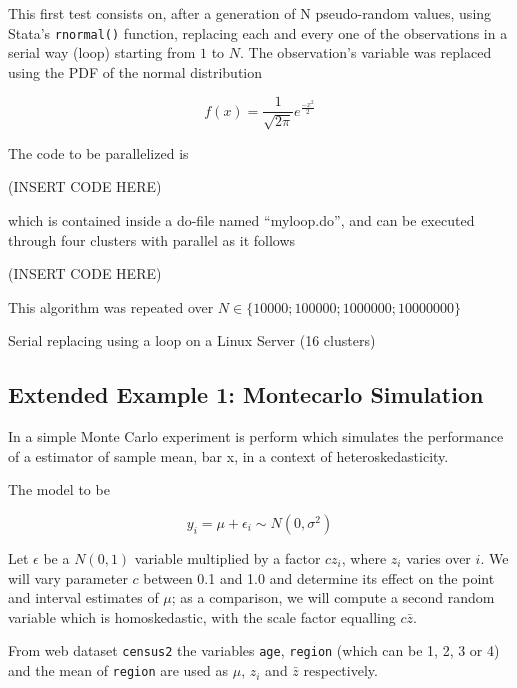 \documentclass[bib]{statapress}
\begin{document}
This first test consists on, after a generation of N pseudo-random values, using Stata's {\tt rnormal()} function, replacing each and every one of the observations in a serial way (loop) starting from $1$ to $N$. The observation's variable was replaced using the PDF of the normal distribution

\begin{equation*}
f(x) = \frac{1}{\sqrt{2 \pi}}e^{\frac{-x^2}{2}}
\end{equation*}

The code to be parallelized is

(INSERT CODE HERE)

\noindent which is contained inside a do-file named ``myloop.do'', and can be executed through four clusters with parallel as it follows

(INSERT CODE HERE)

This algorithm was repeated over $N \in \{10000;100000;1000000;10000000\}$

\begin{table}[!h]
\centering
\caption{Serial replacing using a loop on a Linux Server (16 clusters)}

\end{table}

\subsection{Extended Example 1: Montecarlo Simulation}

In \citet{baum2007} a simple Monte Carlo experiment is perform which simulates the performance of a estimator of sample mean, bar x, in a context of heteroskedasticity.

The model to be

\begin{equation}
y_i = \mu + \epsilon_i \sim N(0,\sigma^2)
\end{equation}

Let $\epsilon$ be a $N(0,1)$ variable multiplied by a factor $cz_i$, where $z_i$ varies over $i$. We will vary parameter $c$ between 0.1 and 1.0 and determine its effect on the point and interval estimates of $\mu$; as a comparison, we will compute a second random variable which is homoskedastic, with the scale factor equalling $c\bar z$.

From web dataset {\tt census2} the variables {\tt age}, {\tt region} (which can be 1, 2, 3 or 4) and the mean of {\tt region} are used as $\mu$, $z_i$ and $\bar z$ respectively.
\end{document}
